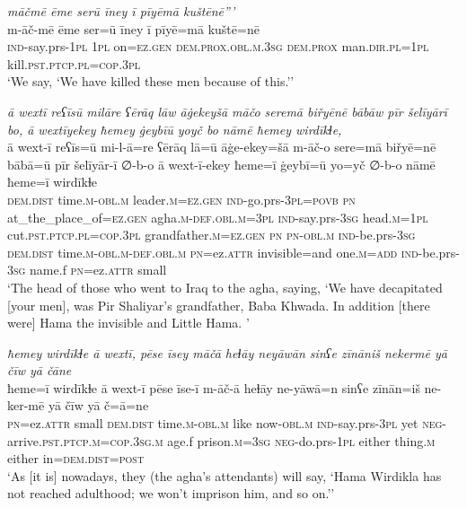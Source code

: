 \ea \label{BP.121}
\textit{māčmē ēme serū īney ī pīyēmā kuštēnē”’} \\ 
\gll m-āč-mē ēme ser=ū īney ī pīyē=mā kuštē=nē \\ 
 \textsc{ind-}say.prs\textsc{-\textsc{1pl}} \textsc{1pl} on\textsc{=ez.gen} \textsc{dem.prox}\textsc{.obl}\textsc{.m}\textsc{.3sg} \textsc{dem.prox} man\textsc{.dir}\textsc{.pl}\textsc{=\textsc{1pl}} kill\textsc{.pst}\textsc{.ptcp}\textsc{.pl}\textsc{=cop}\textsc{.3pl} \\ 
\glt `We say, ‘We have killed these men because of this.’'
\z 
 
\ea \label{BP.122}
\textit{ā wextī reʕīsū milāre ʕērāq lāw āġekeyšā māčo seremā biřyēnē bābāw pīr šelīyārī bo, ā wextīyekey ħemey ġeybīū yoyč bo nāmē ħemey wirdīkɫe,} \\ 
\gll ā wext-ī reʕīs=ū mi-l-ā=re ʕērāq lā=ū āġe-ekey=šā m-āč-o sere=mā biřyē=nē bābā=ū pīr šelīyār-ī ∅-b-o ā wext-ī-ekey ħeme=ī ġeybī=ū yo=yč ∅-b-o nāmē ħeme=ī wirdīkɫe \\ 
 \textsc{dem.dist} time\textsc{.m}\textsc{-obl}\textsc{.m} leader\textsc{.m}\textsc{=ez.gen} \textsc{ind-}go.prs\textsc{-3pl}\textsc{=\textsc{povb}} \textsc{pn} at\_the\_place\_of\textsc{=ez.gen} agha\textsc{.m}\textsc{-def}\textsc{.obl}\textsc{.m}\textsc{=3pl} \textsc{ind-}say.prs\textsc{-3sg} head\textsc{.m}\textsc{=\textsc{1pl}} cut\textsc{.pst}\textsc{.ptcp}\textsc{.pl}\textsc{=cop}\textsc{.3pl} grandfather\textsc{.m}\textsc{=ez.gen} \textsc{pn} \textsc{pn}\textsc{-obl}\textsc{.m} \textsc{ind-}be.prs\textsc{-3sg} \textsc{dem.dist} time\textsc{.m}\textsc{-obl}\textsc{.m}\textsc{-def}\textsc{.obl}\textsc{.m} \textsc{pn}=ez.\textsc{attr} invisible=and one\textsc{.m}\textsc{=add} \textsc{ind-}be.prs\textsc{-3sg} name.f \textsc{pn}=ez.\textsc{attr} small \\ 
\glt `The head of those who went to Iraq to the agha, saying, ‘We have decapitated [your men], was Pir Shaliyar’s grandfather, Baba Khwada. In addition [there were] Hama the invisible and Little Hama. '
\z 
 
\ea \label{BP.123}
\textit{ħemey wirdīkɫe ā wextī, pēse īsey māčā heɫāy neyāwān sinʕe zīnāniš nekermē yā čīw yā čāne} \\ 
\gll ħeme=ī wirdīkɫe ā wext-ī pēse īse-ī m-āč-ā heɫāy ne-yāwā=n sinʕe zīnān=iš ne-ker-mē yā čīw yā č=ā=ne \\ 
 \textsc{pn}=ez.\textsc{attr} small \textsc{dem.dist} time\textsc{.m}\textsc{-obl}\textsc{.m} like now\textsc{-obl}\textsc{.m} \textsc{ind-}say.prs\textsc{-3pl} yet \textsc{neg-}arrive\textsc{.pst}\textsc{.ptcp}\textsc{.m}\textsc{=cop}\textsc{.3sg}\textsc{.m} age.f prison\textsc{.m}\textsc{=3sg} \textsc{neg-}do.prs\textsc{-\textsc{1pl}} either thing\textsc{.m} either in=\textsc{dem.dist}\textsc{=\textsc{post}} \\ 
\glt `As [it is] nowadays, they (the agha’s attendants) will say, ‘Hama Wirdikla has not reached adulthood; we won’t imprison him, and so on.’'
\z 
 
